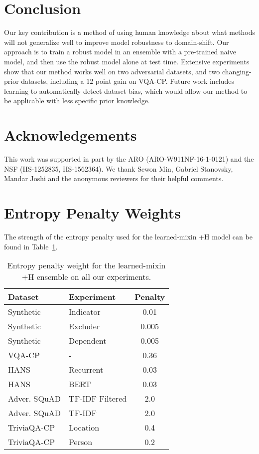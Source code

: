 \documentclass[11pt,a4paper]{article}
\begin{document}
\section{Conclusion}
Our key contribution is a method of using human knowledge about what methods will not generalize well to improve model robustness to domain-shift. 
Our approach is to train a robust model in an ensemble with a pre-trained naive model, and then use the robust model alone at test time. Extensive experiments show that our method works well on two adversarial datasets, and two changing-prior datasets, including a 12 point gain on VQA-CP. Future work includes learning to automatically detect dataset bias, which would allow our method to be applicable with less specific prior knowledge. 
\section*{Acknowledgements}
This work was supported in part by the ARO (ARO-W911NF-16-1-0121) and the NSF (IIS-1252835, IIS-1562364). We thank Sewon Min, Gabriel Stanovsky, Mandar Joshi and the anonymous reviewers for their helpful comments.
 



\appendix
\section{Entropy Penalty Weights}
\label{appendix:penalty_weights}
The strength of the entropy penalty used for the learned-mixin +H model can be found in Table~\ref{tab:hyperparameters}.

\begin{table}[]
    \centering
    \begin{tabular}{l|l|c}
        Dataset & Experiment & Penalty \\ \hline
        Synthetic & Indicator & 0.01 \\
        Synthetic & Excluder & 0.005 \\
        Synthetic & Dependent & 0.005 \\
        VQA-CP & - & 0.36 \\
        HANS & Recurrent & 0.03 \\
        HANS & BERT & 0.03 \\
        Adver. SQuAD & TF-IDF Filtered & 2.0 \\
        Adver. SQuAD & TF-IDF & 2.0 \\
        TriviaQA-CP & Location & 0.4 \\
        TriviaQA-CP & Person & 0.2 \\
    \end{tabular}
    \caption{Entropy penalty weight for the learned-mixin +H ensemble on all our experiments.}
    \label{tab:hyperparameters}
\end{table}
\end{document}
